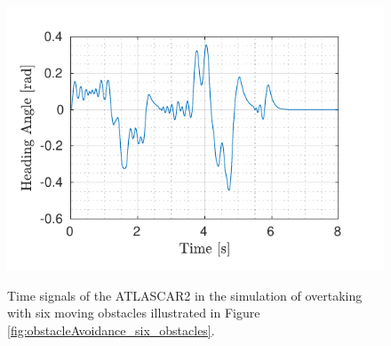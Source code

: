 \begin{figure}[!t]
\begin{minipage}[t]{0.5\textwidth}
		\subcaption{}\label{fig:delta_six_moving}
	\end{minipage}
	\begin{minipage}[t]{0.5\textwidth}
		\includegraphics[width=\textwidth]{../../MATLAB/6_obstacles/figure/HeadingAngleVsTime.pdf}
		\subcaption{}\label{fig:theta_six_moving}
	\end{minipage}
	\caption{Time signals of the ATLASCAR2 in the simulation of overtaking with six moving obstacles illustrated in Figure \ref{fig:obstacleAvoidance_six_obstacles}.}
	\label{fig:components_six_moving_obstacles}
\end{figure}

